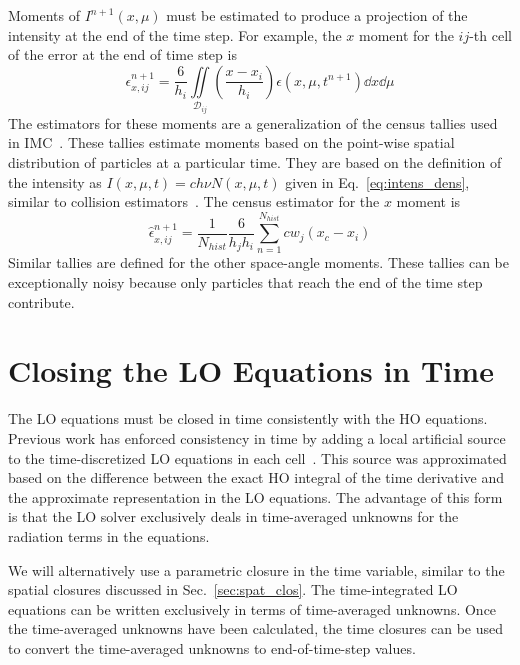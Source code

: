 Moments of $I^{n+1}(x,\mu)$ must be estimated to produce a projection of the intensity at
the end of the time step.
For example, the $x$ moment for the $ij$-th cell of the error at the end of time step is
\begin{equation}
    \epsilon^{n+1}_{x,ij} = \frac{6}{h_i} \iint\limits_{\mathcal{D}_{ij}} \left(\frac{x
    - x_i}{h_i}\right) \epsilon(x,\mu,t^{n+1}) \dd x \dd \mu
\end{equation}
The estimators for these moments are a generalization of the census
tallies used in IMC~\cite{wollaber_review,wollaber_thesis}.  These tallies estimate
moments based on the point-wise spatial distribution of particles at a particular time.
They are based on the definition of the intensity as $I(x,\mu,t) = c h \nu N(x,\mu,t)$ given in
Eq.~\eqref{eq:intens_dens}, similar to collision estimators~\cite{shultis_mc,mcnp}.  The census estimator for the $x$ moment is
\begin{equation}
    \hat\epsilon^{n+1}_{x,ij} = \frac{1}{N_{hist}} \frac{6}{h_j h_i} \sum_{n=1}^{N_{hist}}
    c w_j  \left(x_{c} - x_{i}\right)
\end{equation}
Similar tallies are defined for the other space-angle moments. These tallies can be
exceptionally noisy because only particles that reach the end of the time step contribute.


\section{Closing the LO Equations in Time}

The LO equations must be closed in time consistently with the HO
equations.   Previous work has enforced
consistency in time by adding a local artificial source to the time-discretized LO
equations in each cell~\cite{holo_rh}.  This
source was approximated based on the difference between the exact HO integral of the time
derivative and the approximate representation in the LO equations. The advantage
of this form is that the LO solver exclusively deals in
time-averaged unknowns for the radiation terms in the equations.  

We will alternatively use a
parametric closure in the time variable, similar to the spatial closures discussed in 
Sec.~\ref{sec:spat_clos}.  The time-integrated LO equations can be written exclusively in terms
of time-averaged unknowns.   Once the time-averaged unknowns have been calculated,
the time closures can be used to convert the time-averaged unknowns to end-of-time-step
values.

